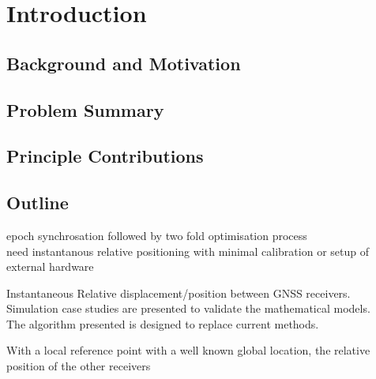 
\def\chapdir{./ChapterIntro}

\chapter{Introduction} \label{ch:intro}



\section{Background and Motivation}

\section{Problem Summary}

\section{Principle Contributions}

\section{Outline}

epoch synchrosation followed by two fold optimisation process\\
need instantanous relative positioning with minimal calibration or setup of external hardware

Instantaneous Relative displacement/position between GNSS receivers.\\
Simulation case studies are presented to validate the mathematical models.\\

The algorithm presented is designed to replace current methods.

With a local reference point with a well known global location, the relative position of the other receivers 